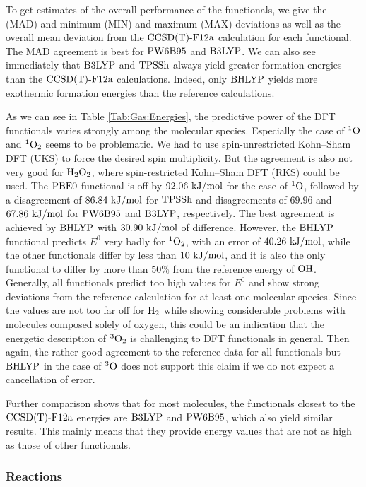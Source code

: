 To get estimates of the overall performance of the functionals,
we give the  (MAD) and minimum (MIN)
and maximum (MAX) deviations as well as the overall mean deviation
from the $\text{CCSD(T)-F12a}$ calculation for each functional. The MAD agreement is
best for $\text{PW6B95}$ and $\text{B3LYP}$. We can also see immediately
that $\text{B3LYP}$ and $\text{TPSSh}$ always yield greater formation energies
than the $\text{CCSD(T)-F12a}$ calculations. Indeed, only $\text{BHLYP}$ yields 
more exothermic formation energies than the reference calculations. 

As we can see in Table \ref{Tab:Gas:Energies}, the predictive power
of the DFT functionals varies strongly among the molecular species.
Especially the case of ${^1\text{O}}$ and ${^1\text O_2}$ seems to be problematic. We had
to use spin-unrestricted Kohn--Sham DFT (UKS) to force the desired spin
multiplicity. But the agreement is also not very good for $\text H _2 \text O_2$, where
spin-restricted Kohn--Sham DFT (RKS) could be used.
The $\text{PBE0}$ functional is off by $92.06~\text {kJ/mol}$ for the case of ${^1\text{O}}$, followed
by a disagreement of $86.84~\text {kJ/mol}$ for $\text{TPSSh}$ and disagreements
of $69.96$ and $67.86~\text {kJ/mol}$ for $\text{PW6B95}$ and $\text{B3LYP}$, respectively.
The best agreement is achieved by $\text{BHLYP}$ with $30.90~\text {kJ/mol}$ of
difference. However, the $\text{BHLYP}$ functional predicts 
$E^0$ very badly for ${^1\text O_2}$, with an error of $40.26~\text {kJ/mol}$,
while the other functionals differ by less than $10~\text {kJ/mol}$, and it is also
the only functional to differ by more than $50\%$ from the reference energy
of $\text O \text H$. Generally, all functionals predict too high values for $E^0$
and show strong deviations from the reference calculation for at least one
molecular species.
Since the values are not too far off for $\text H_2$ while showing
considerable problems with molecules composed solely of oxygen,
this could be an indication that the energetic description of ${^3\text O_2}$
is challenging to DFT functionals in general. Then again, the rather good
agreement to the reference data for all functionals but $\text{BHLYP}$ in the case
of ${^3\text{O}}$ does not support this claim if we do not expect
a cancellation of error.

Further comparison shows that for most molecules, the functionals
closest to the $\text{CCSD(T)-F12a}$ energies are $\text{B3LYP}$ and $\text{PW6B95}$, which
also yield similar results. This mainly means that they provide
energy values that are not as high as those of other functionals. 

\subsubsection{Reactions}
\label{Sec:Gas:Reaction}

